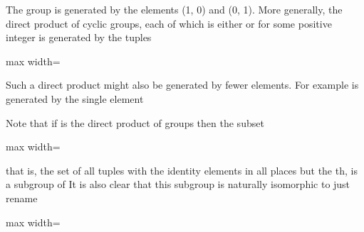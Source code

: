 \documentclass[11pt,oneside]{article}
\begin{document}
\begin{BookBody}
 The group  is generated by the elements (1, 0) and (0, 1). More generally, the direct product of  cyclic groups, each of which is either  or  for some positive integer  is generated by the tuples

\begin{center}\begin{adjustbox}{max width=\linewidth}\end{adjustbox}\end{center}

\noindent Such a direct product might also be generated by fewer elements. For example  is generated by the single element \BookEnd{\blacktriangle}

Note that if  is the direct product of groups  then the subset

\begin{center}\begin{adjustbox}{max width=\linewidth}\end{adjustbox}\end{center}

\noindent that is, the set of all tuples with the identity elements in all places but the th, is a subgroup of  It is also clear that this subgroup  is naturally isomorphic to  just rename

\begin{center}\begin{adjustbox}{max width=\linewidth}\end{adjustbox}\end{center}


\end{BookBody}
\end{document}

